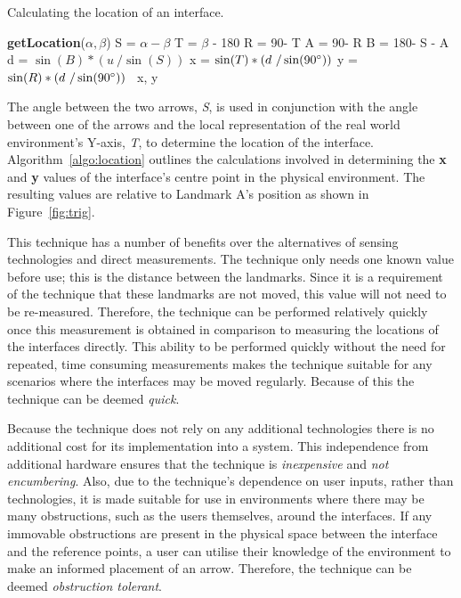 \documentclass{bmcart}
\newcommand{\INDSTATE}[1][1]{\STATE\hspace{#1\algorithmicindent}}
\begin{document}
\begin{algorithm}[h]
\caption{Calculating the location of an interface.}
\label{algo:location}
\begin{algorithmic}
\STATE \textbf{getLocation}(${\alpha}, {\beta}$)
\INDSTATE[2] S = $\alpha - \beta$
\INDSTATE[2] T = $\beta$ - 180\degree
\INDSTATE[2] R = 90\degree - T
\INDSTATE[2] A = 90\degree - R
\INDSTATE[2] B = 180\degree - S - A
\INDSTATE[2] d = $\sin (B) * (u\ / \sin (S))$
\INDSTATE[2] x = $\sin (T) * (d\ / \sin (90\degree))$
\INDSTATE[2] y = $\sin (R) * (d\ / \sin (90\degree))$
\ x, y
\end{algorithmic}
\end{algorithm}

The angle between the two arrows, {\emph{S}}, is used in conjunction with the angle between one of the arrows and the local representation of the real world environment's Y-axis, {\emph{T}}, to determine the location of the interface.
Algorithm~\ref{algo:location} outlines the calculations involved in determining the \textbf{x} and \textbf{y} values of the interface's centre point in the physical environment.
The resulting values are relative to Landmark A's position as shown in Figure~\ref{fig:trig}.

This technique has a number of benefits over the alternatives of sensing technologies and direct measurements.
The technique only needs one known value before use; this is the distance between the landmarks.
Since it is a requirement of the technique that these landmarks are not moved, this value will not need to be re-measured.
Therefore, the technique can be performed relatively quickly once this measurement is obtained in comparison to measuring the locations of the interfaces directly.
This ability to be performed quickly without the need for repeated, time consuming measurements makes the technique suitable for any scenarios where the interfaces may be moved regularly.
Because of this the technique can be deemed {\emph{quick}}.

Because the technique does not rely on any additional technologies there is no additional cost for its implementation into a system.
This independence from additional hardware ensures that the technique is {\emph{inexpensive}} and {\emph{not encumbering}}.
Also, due to the technique's dependence on user inputs, rather than technologies, it is made suitable for use in environments where there may be many obstructions, such as the users themselves, around the interfaces.
If any immovable obstructions are present in the physical space between the interface and the reference points, a user can utilise their knowledge of the environment to make an informed placement of an arrow.
Therefore, the technique can be deemed {\emph{obstruction tolerant}}.
\end{document}
